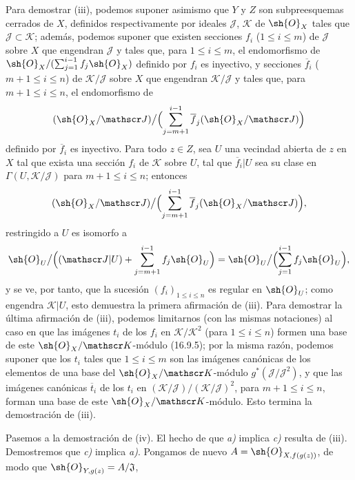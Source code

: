 Para demostrar (iii), podemos suponer asimismo que $Y$ y $Z$ son subpreesquemas cerrados de $X$, definidos respectivamente por ideales $\mathscr J$, $\mathscr K$ de $\sh{O}_X$ tales que $\mathscr J\subset\mathscr K$; además, podemos suponer que existen secciones $f_i$ ($1\leq i\leq m$) de $\mathscr J$ sobre $X$ que engendran $\mathscr J$ y tales que, para $1\leq i\leq m$, el endomorfismo de $\sh{O}_X/(\sum_{j=1}^{i-1}f_j\sh{O}_X)$ definido por $f_i$ es inyectivo, y secciones $\overline f_i$ ($m+1\leq i\leq n$) de $\mathscr K/\mathscr J$ sobre $X$ que engendran $\mathscr K/\mathscr J$ y tales que, para $m+1\leq i\leq n$, el endomorfismo de
\[
  (\sh{O}_X/\mathscr J)\big/\Bigl(\sum_{j=m+1}^{i-1}\overline f_j(\sh{O}_X/\mathscr J)\Bigr)
\]
definido por $\overline f_i$ es inyectivo. Para todo $z\in Z$, sea $U$ una vecindad abierta de $z$ en $X$ tal que exista una sección $f_i$ de $\mathscr K$ sobre $U$, tal que $\overline f_i|U$ sea su clase en $\Gamma(U,\mathscr K/\mathscr J)$ para $m+1\leq i\leq n$; entonces
\[
  (\sh{O}_X/\mathscr J)\big/\Bigl(\sum_{j=m+1}^{i-1}\overline f_j(\sh{O}_X/\mathscr J)\Bigr),
\]
restringido a $U$ es isomorfo a
\[
  \sh{O}_U\big/\Bigl((\mathscr J|U)+\sum_{j=m+1}^{i-1}f_j\sh{O}_U\Bigr)
  =\sh{O}_U\big/\Bigl(\sum_{j=1}^{i-1}f_j\sh{O}_U\Bigr),
\]
y se ve, por tanto, que la sucesión $(f_i)_{1\leq i\leq n}$ es regular en $\sh{O}_U$; como engendra $\mathscr K|U$, esto demuestra la primera afirmación de (iii). Para demostrar la última afirmación de (iii), podemos limitarnos (con las mismas notaciones) al caso en que las imágenes $t_i$ de los $f_i$ en $\mathscr K/\mathscr K^2$ (para $1\leq i\leq n$) formen una base de este $\sh{O}_X/\mathscr K$-módulo (16.9.5); por la misma razón, podemos suponer que los $t_i$ tales que $1\leq i\leq m$ son las imágenes canónicas de los elementos de una base del $\sh{O}_X/\mathscr K$-módulo $g^*(\mathscr J/\mathscr J^2)$, y que las imágenes canónicas $\overline t_i$ de los $t_i$ en $(\mathscr K/\mathscr J)/(\mathscr K/\mathscr J)^2$, para $m+1\leq i\leq n$, forman una base de este $\sh{O}_X/\mathscr K$-módulo. Esto termina la demostración de (iii).

Pasemos a la demostración de (iv). El hecho de que \emph{a)} implica \emph{c)} resulta de (iii). Demostremos que \emph{c)} implica \emph{a)}. Pongamos de nuevo $A=\sh{O}_{X,f(g(z))}$, de modo que $\sh{O}_{Y,g(z)}=A/\mathfrak J$,


